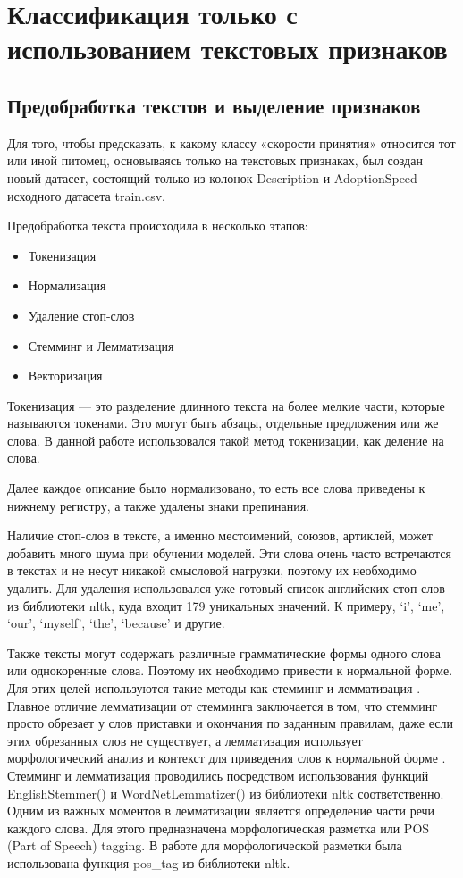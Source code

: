 \documentclass[14pt]{mmcs_article}
\begin{document}
\newpage
\section{Классификация только с использованием текстовых признаков}

\subsection{Предобработка текстов и выделение признаков}

Для того, чтобы предсказать, к какому классу «скорости принятия» относится тот или иной питомец, основываясь только на текстовых признаках, был создан новый датасет, состоящий только из колонок Description и AdoptionSpeed исходного датасета train.csv.

Предобработка текста происходила в несколько этапов:

\begin{itemize}
	\item Токенизация
	\item Нормализация
	\item Удаление стоп-слов
	\item Стемминг и Лемматизация
	\item Векторизация
\end{itemize}

Токенизация --- это разделение длинного текста на более мелкие части, которые называются токенами. Это могут быть абзацы, отдельные предложения или же слова. В данной работе использовался такой метод токенизации, как деление на слова.
 
Далее каждое описание было нормализовано, то есть все слова приведены к нижнему регистру, а также удалены знаки препинания. 

Наличие стоп-слов в тексте, а именно местоимений, союзов, артиклей, может добавить много шума при обучении моделей. Эти слова очень часто встречаются в текстах и не несут никакой смысловой нагрузки, поэтому их необходимо удалить. Для удаления использовался уже готовый список английских стоп-слов из библиотеки nltk, куда входит 179 уникальных значений. К примеру, `i', `me', `our', `myself', `the', `because' и другие. 

Также тексты могут содержать различные грамматические формы одного слова или однокоренные слова. Поэтому их необходимо привести к нормальной форме. Для этих целей используются такие методы как стемминг и лемматизация \cite{lib:stemlem}. Главное отличие лемматизации от стемминга заключается в том, что стемминг просто обрезает у слов приставки и окончания по заданным правилам, даже если этих обрезанных слов не существует, а лемматизация использует морфологический анализ и контекст для приведения слов к нормальной форме \cite{lib:langproc}. Стемминг и лемматизация проводились посредством использования функций EnglishStemmer() и WordNetLemmatizer() из библиотеки nltk соответственно. Одним из важных моментов в лемматизации является определение части речи каждого слова. Для этого предназначена морфологическая разметка или POS (Part of Speech) tagging. В работе для морфологической разметки была использована функция pos\_tag из библиотеки nltk.
\end{document}
